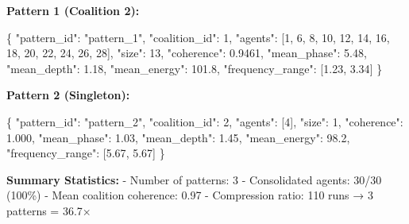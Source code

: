 \documentclass[
]{article}
\newenvironment{Shaded}{}{}
\newcommand{\DataTypeTok}[1]{\textcolor[rgb]{0.56,0.13,0.00}{#1}}
\newcommand{\DecValTok}[1]{\textcolor[rgb]{0.25,0.63,0.44}{#1}}
\newcommand{\FloatTok}[1]{\textcolor[rgb]{0.25,0.63,0.44}{#1}}
\newcommand{\FunctionTok}[1]{\textcolor[rgb]{0.02,0.16,0.49}{#1}}
\newcommand{\OtherTok}[1]{\textcolor[rgb]{0.00,0.44,0.13}{#1}}
\newcommand{\StringTok}[1]{\textcolor[rgb]{0.25,0.44,0.63}{#1}}
\begin{document}
\textbf{Pattern 1 (Coalition 2):}

\begin{Shaded}
\begin{Highlighting}[]
\FunctionTok{\{}
  \DataTypeTok{"pattern\_id"}\FunctionTok{:} \StringTok{"pattern\_1"}\FunctionTok{,}
  \DataTypeTok{"coalition\_id"}\FunctionTok{:} \DecValTok{1}\FunctionTok{,}
  \DataTypeTok{"agents"}\FunctionTok{:} \OtherTok{[}\DecValTok{1}\OtherTok{,} \DecValTok{6}\OtherTok{,} \DecValTok{8}\OtherTok{,} \DecValTok{10}\OtherTok{,} \DecValTok{12}\OtherTok{,} \DecValTok{14}\OtherTok{,} \DecValTok{16}\OtherTok{,} \DecValTok{18}\OtherTok{,} \DecValTok{20}\OtherTok{,} \DecValTok{22}\OtherTok{,} \DecValTok{24}\OtherTok{,} \DecValTok{26}\OtherTok{,} \DecValTok{28}\OtherTok{]}\FunctionTok{,}
  \DataTypeTok{"size"}\FunctionTok{:} \DecValTok{13}\FunctionTok{,}
  \DataTypeTok{"coherence"}\FunctionTok{:} \FloatTok{0.9461}\FunctionTok{,}
  \DataTypeTok{"mean\_phase"}\FunctionTok{:} \FloatTok{5.48}\FunctionTok{,}
  \DataTypeTok{"mean\_depth"}\FunctionTok{:} \FloatTok{1.18}\FunctionTok{,}
  \DataTypeTok{"mean\_energy"}\FunctionTok{:} \FloatTok{101.8}\FunctionTok{,}
  \DataTypeTok{"frequency\_range"}\FunctionTok{:} \OtherTok{[}\FloatTok{1.23}\OtherTok{,} \FloatTok{3.34}\OtherTok{]}
\FunctionTok{\}}
\end{Highlighting}
\end{Shaded}

\textbf{Pattern 2 (Singleton):}

\begin{Shaded}
\begin{Highlighting}[]
\FunctionTok{\{}
  \DataTypeTok{"pattern\_id"}\FunctionTok{:} \StringTok{"pattern\_2"}\FunctionTok{,}
  \DataTypeTok{"coalition\_id"}\FunctionTok{:} \DecValTok{2}\FunctionTok{,}
  \DataTypeTok{"agents"}\FunctionTok{:} \OtherTok{[}\DecValTok{4}\OtherTok{]}\FunctionTok{,}
  \DataTypeTok{"size"}\FunctionTok{:} \DecValTok{1}\FunctionTok{,}
  \DataTypeTok{"coherence"}\FunctionTok{:} \FloatTok{1.000}\FunctionTok{,}
  \DataTypeTok{"mean\_phase"}\FunctionTok{:} \FloatTok{1.03}\FunctionTok{,}
  \DataTypeTok{"mean\_depth"}\FunctionTok{:} \FloatTok{1.45}\FunctionTok{,}
  \DataTypeTok{"mean\_energy"}\FunctionTok{:} \FloatTok{98.2}\FunctionTok{,}
  \DataTypeTok{"frequency\_range"}\FunctionTok{:} \OtherTok{[}\FloatTok{5.67}\OtherTok{,} \FloatTok{5.67}\OtherTok{]}
\FunctionTok{\}}
\end{Highlighting}
\end{Shaded}

\textbf{Summary Statistics:} - Number of patterns: 3 - Consolidated
agents: 30/30 (100\%) - Mean coalition coherence: 0.97 - Compression
ratio: 110 runs → 3 patterns = 36.7×
\end{document}
